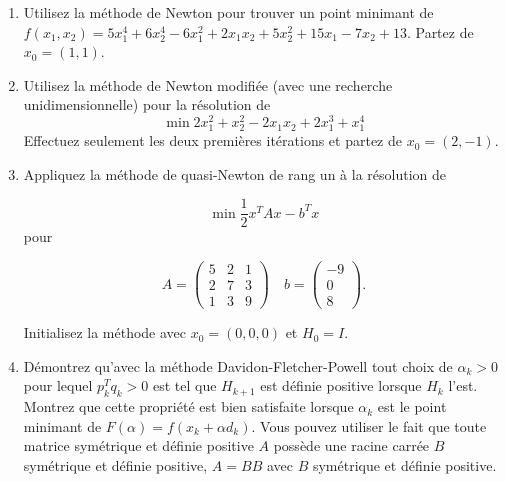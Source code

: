 \begin{enumerate}



    \begin{solution}
    \end{solution}

  \item Utilisez la méthode de Newton pour trouver un point minimant de $f(x_1, x_2)=5x_1^4+6x_2^4-6x_1^2+2 x_1 x_2 +5x_2^2+15x_1-7x_2+13$.
    Partez de $x_0=(1, 1)$.

    \begin{solution}
    \end{solution}

  \item Utilisez la méthode de Newton modifiée (avec une recherche unidimensionnelle) pour la résolution de
    $$\min 2x_1^2 + x_2^2-2x_1 x_2 + 2 x_1^3 + x_1^4$$
    Effectuez seulement les deux premières
    itérations et partez de $x_0=(2, -1)$.



    \begin{solution}
    \end{solution}

  \item Appliquez la méthode de quasi-Newton de rang un à la résolution de

    $$\min \frac{1}{2} x^TAx-b^Tx$$ pour

  $$A=\left( \begin{array}{rrr} 5 & 2& 1 \\ 2 & 7 & 3 \\ 1 & 3 & 9 \end{array} \right) \quad  b= \left( \begin{array}{c} -9 \\ 0 \\8
    \end{array} \right).$$

    Initialisez la méthode avec $x_0= (0, 0, 0)$ et $H_0 = I$.



    \begin{solution}
    \end{solution}

  \item  Démontrez qu'avec la méthode Davidon-Fletcher-Powell tout  choix
    de $\alpha_k>0$ pour lequel $p_k^T q_k >0$ est tel que $H_{k+1}$ est définie positive lorsque $H_k$ l'est. Montrez que cette propriété est bien
    satisfaite lorsque $\alpha_k$ est le point minimant de $F(\alpha)=f(x_k+ \alpha d_k)$. Vous pouvez utiliser le fait que toute matrice
    symétrique et définie positive $A$ possède une racine carrée $B$ symétrique et définie positive, $A= B B$ avec $B$ symétrique et
    définie positive.


\end{enumerate}
